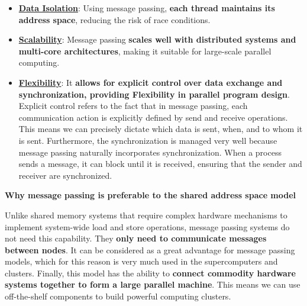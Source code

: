 \begin{itemize}[label=\textcolor{Green3}{}]
    \item \textbf{\underline{Data Isolation}}: Using message passing, \textbf{each thread maintains its address space}, reducing the risk of race conditions.

    \item \textbf{\underline{Scalability}}: Message passing \textbf{scales well with distributed systems and multi-core architectures}, making it suitable for large-scale parallel computing.
    
    \item \textbf{\underline{Flexibility}}: It \textbf{allows for explicit control over data exchange and synchronization, providing Flexibility in parallel program design}. Explicit control refers to the fact that in message passing, each communication action is explicitly defined by send and receive operations. This means we can precisely dictate which data is sent, when, and to whom it is sent. Furthermore, the synchronization is managed very well because message passing naturally incorporates synchronization. When a process sends a message, it can block until it is received, ensuring that the sender and receiver are synchronized.
\end{itemize}

\begin{flushleft}
    \textcolor{Green3}{ \textbf{Why message passing is preferable to the shared address space model}}
\end{flushleft}
Unlike shared memory systems that require complex hardware mechanisms to implement system-wide load and store operations, message passing systems do not need this capability. They \textbf{only need to communicate messages between nodes}. It can be considered as a great advantage for message passing models, which for this reason is very much used in the supercomputers and clusters. Finally, this model has the ability to \textbf{connect commodity hardware systems together to form a large parallel machine}. This means we can use off-the-shelf components to build powerful computing clusters.
